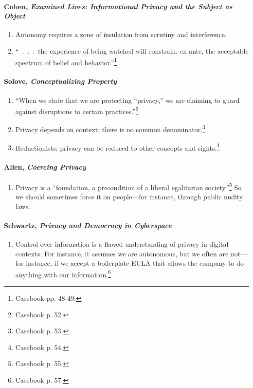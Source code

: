 \paragraph{Cohen, \emph{Examined Lives: Informational Privacy and the Subject 
as Object}}

\begin{enumerate}
    \item Autonomy requires a zone of insulation from scrutiny and 
    interference.
    \item ``~.~.~.~the experience of being watched will constrain, ex ante, 
    the acceptable spectrum of belief and behavior.''\footnote{Casebook pp. 
    48-49.}
\end{enumerate}

\paragraph{Solove, \emph{Conceptualizing Property}}

\begin{enumerate}
    \item ``When we state that we are protecting ``privacy,'' we are claiming 
    to guard against disruptions to certain practices.''\footnote{Casebook p. 
    52.}
    \item Privacy depends on context; there is no common 
    denominator.\footnote{Casebook p. 53.}
    \item Reductionists: privacy can be reduced to other concepts and 
    rights.\footnote{Casebook p. 54.}
\end{enumerate}

\paragraph{Allen, \emph{Coercing Privacy}}

\begin{enumerate}
    \item Privacy is a ``foundation, a precondition of a liberal egalitarian 
    society.''\footnote{Casebook p. 55.} So we should sometimes force it on 
    people---for instance, through public nudity laws.
\end{enumerate}

\paragraph{Schwartz, \emph{Privacy and Democracy in Cyberspace}}

\begin{enumerate}
    \item Control over information is a flawed understanding of privacy in 
    digital contexts. For instance, it assumes we are autonomous, but we often 
    are not---for instance, if we accept a boilerplate EULA that allows the 
    company to do anything with our information.\footnote{Casebook p. 57.}
\end{enumerate}

